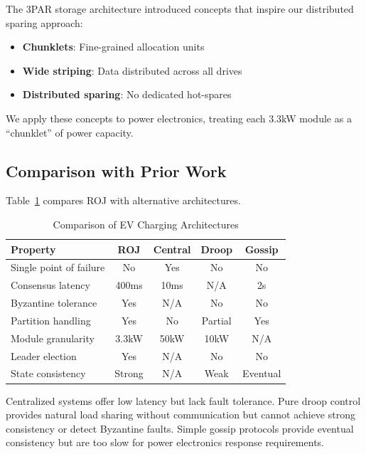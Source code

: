 \documentclass[conference,10pt]{IEEEtran}
\begin{document}
The 3PAR storage architecture \cite{3par2005} introduced concepts that inspire our distributed sparing approach:
\begin{itemize}
    \item \textbf{Chunklets}: Fine-grained allocation units
    \item \textbf{Wide striping}: Data distributed across all drives
    \item \textbf{Distributed sparing}: No dedicated hot-spares
\end{itemize}

We apply these concepts to power electronics, treating each 3.3kW module as a ``chunklet'' of power capacity.

\subsection{Comparison with Prior Work}

Table~\ref{tab:comparison} compares ROJ with alternative architectures.

\begin{table}[htbp]
\caption{Comparison of EV Charging Architectures}
\label{tab:comparison}
\centering
\begin{tabular}{@{}lcccc@{}}
\toprule
\textbf{Property} & \textbf{ROJ} & \textbf{Central} & \textbf{Droop} & \textbf{Gossip} \\
\midrule
Single point of failure & No & Yes & No & No \\
Consensus latency & 400ms & 10ms & N/A & 2s \\
Byzantine tolerance & Yes & N/A & No & No \\
Partition handling & Yes & No & Partial & Yes \\
Module granularity & 3.3kW & 50kW & 10kW & N/A \\
Leader election & Yes & N/A & No & No \\
State consistency & Strong & N/A & Weak & Eventual \\
\bottomrule
\end{tabular}
\end{table}

Centralized systems offer low latency but lack fault tolerance. Pure droop control \cite{guerrero2011hierarchical} provides natural load sharing without communication but cannot achieve strong consistency or detect Byzantine faults. Simple gossip protocols provide eventual consistency but are too slow for power electronics response requirements.
\end{document}

